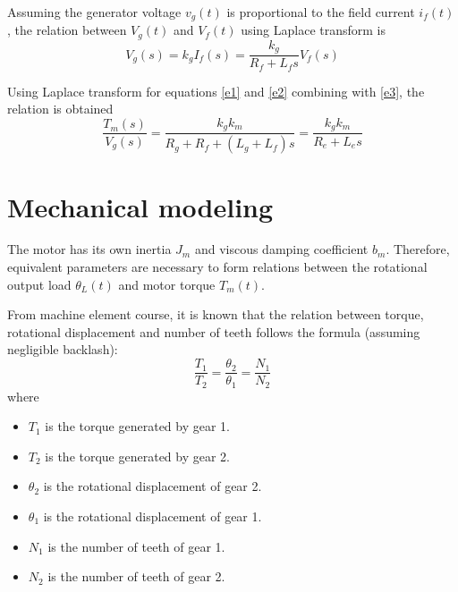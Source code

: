 Assuming the generator voltage $ v_g(t) $ is proportional to the field current $ i_f(t) $, the relation between $ V_g(t) $ and $ V_f(t) $ using Laplace transform is
\begin{equation}\label{e3}
	V_g(s) = k_gI_f(s) = \dfrac{k_g}{R_f+L_fs}V_f(s)
\end{equation}

Using Laplace transform for equations \ref{e1} and \ref{e2} combining with \ref{e3}, the relation is obtained
\begin{equation}\label{e4}
	\dfrac{T_m(s)}{V_g(s)} = \dfrac{k_gk_m}{R_g+R_f + (L_g+L_f)s} = \dfrac{k_gk_m}{R_e+L_es}
\end{equation}

\section{Mechanical modeling}
The motor has its own inertia $ J_m $ and viscous damping coefficient $ b_m $. Therefore, equivalent parameters are necessary to form relations between the rotational output load $ \theta_L(t) $ and motor torque $ T_m(t) $.

From machine element course, it is known that the relation between torque, rotational displacement and number of teeth follows the formula (assuming negligible backlash):
\begin{equation}\label{e5}
	\dfrac{T_1}{T_2} = \dfrac{\theta_2}{\theta_1} = \dfrac{N_1}{N_2}
\end{equation}
where
\begin{itemize}
	\item $ T_1 $ is the torque generated by gear 1.
	\item $ T_2 $ is the torque generated by gear 2.
	\item $ \theta_2 $ is the rotational displacement of gear 2.
	\item $ \theta_1 $ is the rotational displacement of gear 1.
	\item $ N_1 $ is the number of teeth of gear 1.
	\item $ N_2 $ is the number of teeth of gear 2.
\end{itemize}

